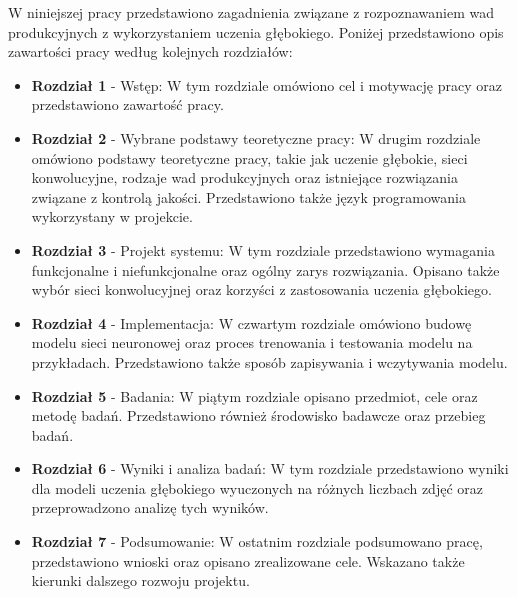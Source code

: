 W niniejszej pracy przedstawiono zagadnienia związane z rozpoznawaniem wad produkcyjnych z wykorzystaniem uczenia głębokiego. Poniżej przedstawiono opis zawartości pracy według kolejnych rozdziałów:

\begin{itemize}
\item \textbf{Rozdział 1} - Wstęp: W tym rozdziale omówiono cel i motywację pracy oraz przedstawiono zawartość pracy.
\item \textbf{Rozdział 2} - Wybrane podstawy teoretyczne pracy: W drugim rozdziale omówiono podstawy teoretyczne pracy, takie jak uczenie głębokie, sieci konwolucyjne, rodzaje wad produkcyjnych oraz istniejące rozwiązania związane z kontrolą jakości. Przedstawiono także język programowania wykorzystany w projekcie.
\item \textbf{Rozdział 3} - Projekt systemu: W tym rozdziale przedstawiono wymagania funkcjonalne i niefunkcjonalne oraz ogólny zarys rozwiązania. Opisano także wybór sieci konwolucyjnej oraz korzyści z zastosowania uczenia głębokiego.
\item \textbf{Rozdział 4} - Implementacja: W czwartym rozdziale omówiono budowę modelu sieci neuronowej oraz proces trenowania i testowania modelu na przykładach. Przedstawiono także sposób zapisywania i wczytywania modelu.
\item \textbf{Rozdział 5} - Badania: W piątym rozdziale opisano przedmiot, cele oraz metodę badań. Przedstawiono również środowisko badawcze oraz przebieg badań.
\item \textbf{Rozdział 6} - Wyniki i analiza badań: W tym rozdziale przedstawiono wyniki dla modeli uczenia głębokiego wyuczonych na różnych liczbach zdjęć oraz przeprowadzono analizę tych wyników.
\item \textbf{Rozdział 7} - Podsumowanie: W ostatnim rozdziale podsumowano pracę, przedstawiono wnioski oraz opisano zrealizowane cele. Wskazano także kierunki dalszego rozwoju projektu.
\end{itemize}